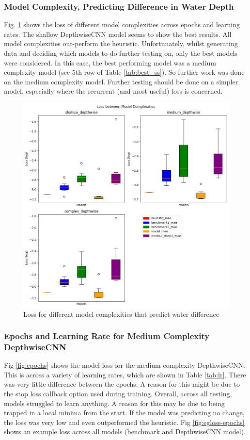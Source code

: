 \subsubsection*{Model Complexity, Predicting Difference in Water Depth}
Fig. \ref{fig:depthwise-complexity} shows the loss of different model complexities across epochs and learning rates. The shallow DepthwiseCNN model seems to show the best results. All model complexities out-perform the heuristic. Unfortunately, whilst generating data and deciding which models to do further testing on, only the best models were considered. In this case, the best performing model was a medium complexity model (see 5th row of Table \ref{tab:best_ss}). So further work was done on the medium complexity model. Further testing should be done on a simpler model, especially where the recurrent (and most useful) loss is concerned. 
\begin{figure}[tbph]
	\centering
	\includegraphics[width=0.7\linewidth, height=0.4\textheight]{Figures/Results/Diff_Complexity_Lr_Epochs/Complexity/Box_model_complexity}
	\caption[Loss Depending on Model Complexity for DepthwiseCNN]{Loss for different model complexities that predict water difference}
	\label{fig:depthwise-complexity}
\end{figure}


\subsubsection*{Epochs and Learning Rate for Medium Complexity DepthwiseCNN}
Fig \ref{fig:epochs} shows the model loss for the medium complexity DepthwiseCNN. This is across a variety of learning rates, which are shown in Table \ref{tab:lr}. There was very little difference between the epochs. A reason for this might be due to the stop loss callback option used during training. Overall, across all testing, models struggled to learn anything. A reason for this may be due to being trapped in a local minima from the start. If the model was predicting no change, the loss was very low and even outperformed the heuristic. Fig \ref{fig:egloss-epochs} shows an example loss across all models (benchmark and DepthwiseCNN model).

